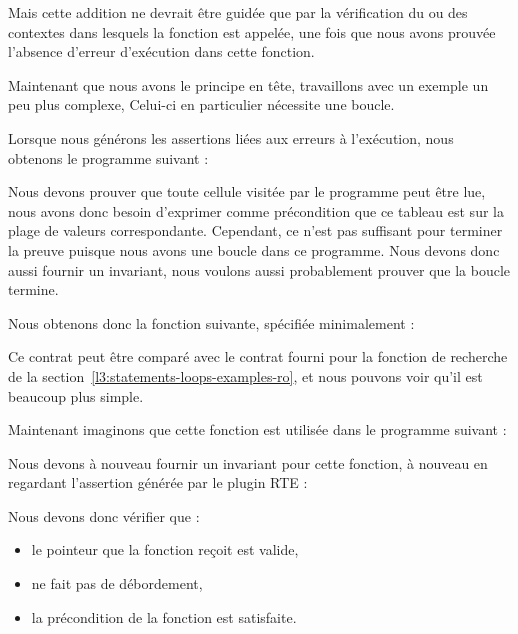 

Mais cette addition ne devrait être guidée que par la vérification du ou des
contextes dans lesquels la fonction est appelée, une fois que nous avons
prouvée l'absence d'erreur d'exécution dans cette fonction.




Maintenant que nous avons le principe en tête, travaillons avec un exemple un peu
plus complexe, Celui-ci en particulier nécessite une boucle.




Lorsque nous générons les assertions liées aux erreurs à l'exécution, nous
obtenons le programme suivant :




Nous devons prouver que toute cellule visitée par le programme peut être lue,
nous avons donc besoin d'exprimer comme précondition que ce tableau est
 sur la plage de valeurs correspondante.
Cependant, ce n'est pas suffisant pour terminer la preuve puisque nous avons une
boucle dans ce programme. Nous devons donc aussi fournir un invariant, nous
voulons aussi probablement prouver que la boucle termine.


Nous obtenons donc la fonction suivante, spécifiée minimalement :





Ce contrat peut être comparé avec le contrat fourni pour la fonction de recherche
de la section~\ref{l3:statements-loops-examples-ro}, et nous pouvons voir qu'il est
beaucoup plus simple.


Maintenant imaginons que cette fonction est utilisée dans le programme suivant :




Nous devons à nouveau fournir un invariant pour cette fonction, à nouveau en
regardant l'assertion générée par le plugin RTE :




Nous devons donc vérifier que :

\begin{itemize}
\item le pointeur que la fonction reçoit est valide,
\item {} ne fait pas de débordement,
\item la précondition de la fonction  est satisfaite.
\end{itemize}


